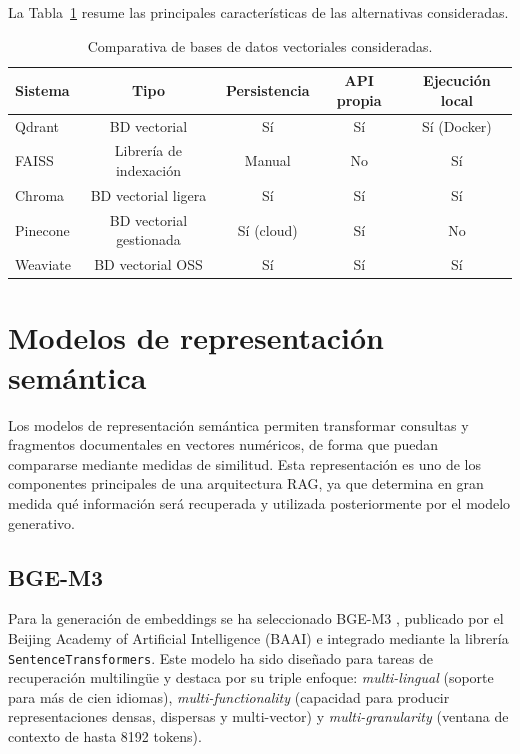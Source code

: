 La Tabla~\ref{tab:comparativa_vectoriales} resume las principales características de las alternativas consideradas.

\begin{table}[H]
\centering
\begin{tabular}{lcccc}
\hline
\textbf{Sistema} & \textbf{Tipo} & \textbf{Persistencia} & \textbf{API propia} & \textbf{Ejecución local} \\
\hline
Qdrant & BD vectorial & Sí & Sí & Sí (Docker) \\
FAISS & Librería de indexación & Manual & No & Sí \\
Chroma & BD vectorial ligera & Sí & Sí & Sí \\
Pinecone & BD vectorial gestionada & Sí (cloud) & Sí & No \\
Weaviate & BD vectorial OSS & Sí & Sí & Sí \\
\hline
\end{tabular}
\caption{Comparativa de bases de datos vectoriales consideradas.}
\label{tab:comparativa_vectoriales}
\end{table}

\section{Modelos de representación semántica}\label{sec:rep-semantica}

Los modelos de representación semántica permiten transformar consultas y fragmentos documentales en vectores numéricos, de forma que puedan compararse mediante medidas de similitud. 
Esta representación es uno de los componentes principales de una arquitectura RAG, ya que determina en gran medida qué información será recuperada y utilizada posteriormente por el modelo generativo.

\subsection{BGE-M3}\label{subsec:embeddings}

Para la generación de embeddings se ha seleccionado BGE-M3 \cite{chen2024bgem3}, publicado por el Beijing Academy of Artificial Intelligence (BAAI) e integrado mediante la librería \texttt{SentenceTransformers}.
Este modelo ha sido diseñado para tareas de recuperación multilingüe y destaca por su triple enfoque: \textit{multi-lingual} (soporte para más de cien idiomas), \textit{multi-functionality} (capacidad para producir representaciones densas, dispersas y multi-vector) y \textit{multi-granularity} (ventana de contexto de hasta 8192 tokens).

